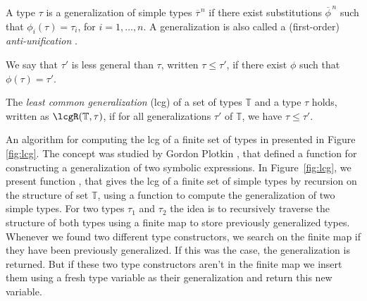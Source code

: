A type $\tau$ is a generalization of simple types
$\overline{\tau}^{\,n}$ if there exist substitutions
$\overline{\phi}^{\,n}$ such that $\phi_i(\tau)=\tau_i$, for
$i=1,\ldots,n$.  A generalization is also called a (first-order) {\em
  anti-unification\/} \cite{ModelTheory2012}.

We say that $\tau'$ is less general than $\tau$, written $\tau \leq
\tau'$, if there exist $\phi$ such that $\phi(\tau) = \tau'$. 

The {\it least common generalization} (lcg) of a set of types
$\mathbb{T}$ and a type $\tau$ holds, written as
$\lcgR(\mathbb{T},\tau)$, if for all generalizations $\tau'$ of
$\mathbb{T}$, we have $\tau \leq \tau'$.

An algorithm for computing the lcg of a finite set of types in
presented in Figure \ref{fig:lcg}. The concept was studied by Gordon
Plotkin \cite{plotkin1970note,plotkin1971further}, that defined a
function for constructing a generalization of two symbolic
expressions.  In Figure~\ref{fig:lcg}, we present function \lcg, that
gives the lcg of a finite set of simple types by recursion on the
structure of set $\mathbb{T}$, using a function to compute the
generalization of two simple types. For two types $\tau_1$ and
$\tau_2$ the idea is to recursively traverse the structure of both
types using a finite map to store previously generalized
types. Whenever we found two different type constructors, we search on
the finite map if they have been previously generalized. If this was
the case, the generalization is returned. But if these two type
constructors aren't in the finite map we insert them using a fresh
type variable as their generalization and return this new variable.

